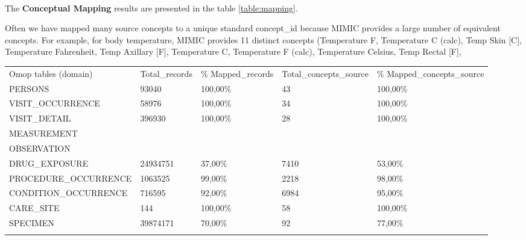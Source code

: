 ~
\\


The \textbf{Conceptual Mapping} results are presented in the table
\ref{table:mapping}. 

Often we have mapped many source concepts to a unique standard concept\_id
because MIMIC provides a large number of equivalent concepts. For example, for
body temperature, MIMIC provides 11 distinct concepts (Temperature F,
Temperature C (calc), Temp Skin [C], Temperature Fahrenheit, Temp Axillary [F],
Temperature C, Temperature F (calc), Temperature Celsius, Temp Rectal [F], 


\begin{table*}[t]
\caption{Terminology Mapping coverage}
\begin{tabular}{@{}lllll@{}}\toprule
Omop tables (domain)   & Total\_records & \% Mapped\_records  & Total\_concepts\_source & \% Mapped\_concepts\_source  \\\colrule
PERSONS                & 93040          & 100,00\%            & 43                      & 100,00\%                     \\
VISIT\_OCCURRENCE      & 58976          & 100,00\%            & 34                      & 100,00\%                     \\
VISIT\_DETAIL          & 396930         & 100,00\%            & 28                      & 100,00\%                     \\
MEASUREMENT            &                &                     &                         &                              \\
OBSERVATION            &                &                     &                         &                              \\
DRUG\_EXPOSURE         & 24934751       & 37,00\%             & 7410                    & 53,00\%                      \\
PROCEDURE\_OCCURRENCE  & 1063525        & 99,00\%             & 2218                    & 98,00\%                      \\
CONDITION\_OCCURRENCE  & 716595         & 92,00\%             & 6984                    & 95,00\%                      \\
CARE\_SITE             & 144            & 100,00\%            & 58                      & 100,00\%                     \\
SPECIMEN               & 39874171       & 70,00\%             & 92                      & 77,00\%                      \\\botrule
\end{tabular}
\label{table:mapping}
\end{table*}

